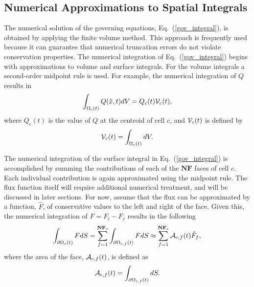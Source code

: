 \subsection{Numerical Approximations to Spatial Integrals}

The numerical solution of the governing equations,
Eq.~(\ref{gov_integral}), is obtained by applying the finite
volume method.  This approach is frequently used because it can
guarantee that numerical truncation errors do not violate
conservation properties.  The numerical integration of
Eq.~(\ref{gov_integral}) begins with approximations to volume and surface
integrals.  For the volume integrals a second-order midpoint rule is
used.  For example, the numerical integration of $Q$ results in
\begin{equation}
\int_{\Omega_c(t)} Q(\Tilde{x},t) dV = Q_c(t) \mathcal{V}_c(t), 
\end{equation}
where $Q_c(t)$ is the value of $Q$ at the centroid of cell $c$, and
$\mathcal{V}_c(t)$ is defined by
\begin{equation}
\mathcal{V}_c(t) = \int_{\Omega_c(t)} dV.
\label{eq:volume_exact}
\end{equation}

The numerical integration of the surface integral in
Eq.~(\ref{gov_integral}) is accomplished by summing the contributions of
each of the $\mathbf{NF}$ faces of cell $c$.  Each individual contribution is
again approximated using the midpoint rule.  The flux function itself
will require additional numerical treatment, and will be discussed in
later sections.  For now, assume that the flux can be approximated by
a function, $\hat{F}$, of conservative values to the left and right of
the face.  Given this, the numerical integration of $F=F_i-F_v$
results in the following
\begin{equation}
\int_{\partial \Omega_c(t)} F dS = \sum_{f=1}^{\mathbf{NF}_c} \int_{\partial
  \Omega_{c,f}(t)} F dS \approx 
  \sum_{f=1}^{\mathbf{NF}_c} \mathcal{A}_{c,f}(t) \hat{F}_{f},
\end{equation}
where the area of the face, $\mathcal{A}_{c,f}(t)$, is defined as
\begin{equation}
\mathcal{A}_{c,f}(t) = \int_{\partial \Omega_{c,f}(t)} dS.
\label{eq:area_exact}
\end{equation}

